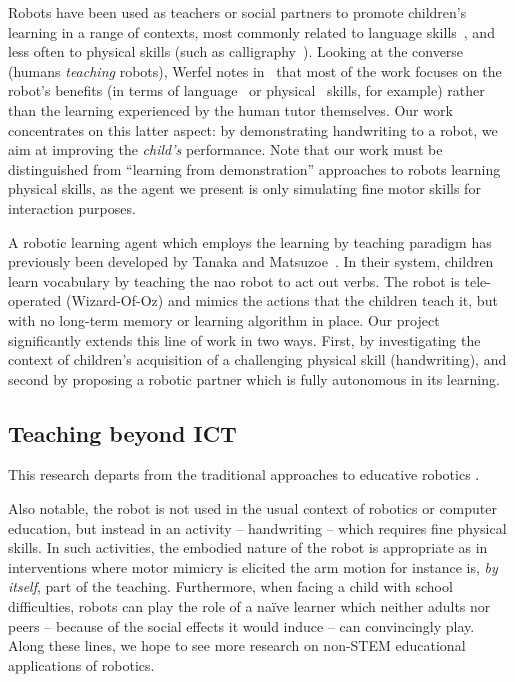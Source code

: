 \documentclass{article}
\begin{document}
Robots have been used as teachers or social partners to promote children's
learning in a range of contexts, most commonly related to language
skills~\cite{han2010robot}, and less often to physical skills (such as
calligraphy~\cite{Matsui2013}). Looking at the converse (humans \emph{teaching}
robots), Werfel notes in~\cite{Werfel2014} that most of the work focuses on the
robot's benefits (in terms of language~\cite{Saunders2010} or
physical~\cite{Mulling2013} skills, for example) rather than the learning
experienced by the human tutor themselves.  Our work concentrates on this latter
aspect: by demonstrating handwriting to a robot, we aim at improving the
\emph{child's} performance. Note that our work must be distinguished from
``learning from demonstration'' approaches to robots learning physical skills,
as the agent we present is only simulating fine motor skills for interaction
purposes.

A robotic learning agent which employs the learning by teaching paradigm has
previously been developed by Tanaka and Matsuzoe~\cite{Tanaka2012}. In their
system, children learn vocabulary by teaching the {\sc nao} robot to act out
verbs. The robot is tele-operated (Wizard-Of-Oz) and mimics the actions that the
children teach it, but with no long-term memory or learning algorithm in place.
Our project significantly extends this line of work in two ways. First, by
investigating the context of children's acquisition of a challenging physical
skill (handwriting), and second by proposing a robotic partner which is fully
autonomous in its learning.

\subsection{Teaching beyond ICT}

This research departs from the traditional approaches to educative robotics
\cite{barker2007robotics,karim2015review}.

Also notable, the robot is not used in the usual context of robotics or computer
education, but instead in an activity -- handwriting -- which requires fine
physical skills. In such activities, the embodied nature of the robot is
appropriate as in interventions where motor mimicry is elicited
\cite{Berninger1997} the arm motion for instance is, \emph{by itself}, part of
the teaching. Furthermore, when facing a child with school difficulties, robots
can play the role of a na\"ive learner which neither adults nor peers -- because
of the social effects it would induce -- can convincingly play. Along these
lines, we hope to see more research on non-STEM educational applications of
robotics.
\end{document}
